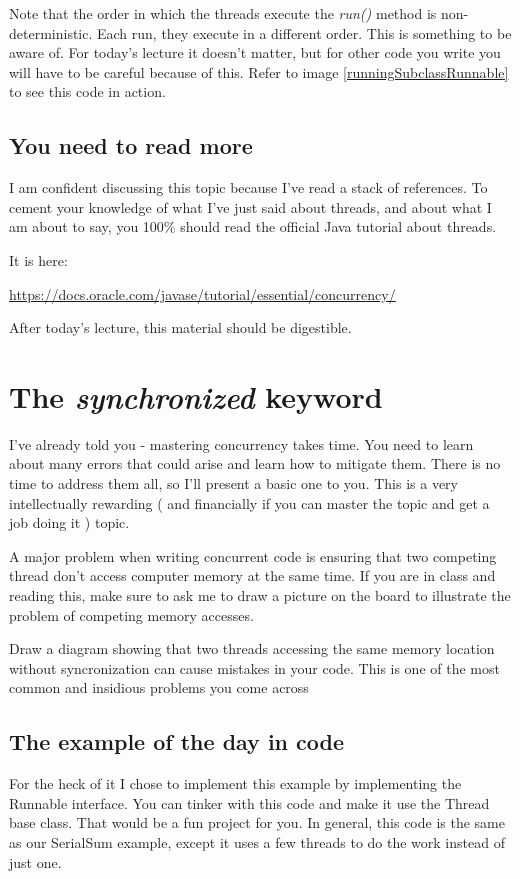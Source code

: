 \documentclass[12pt]{article}
\begin{document}
Note that the order in which the threads execute the \textit{run()} method is
non-deterministic. Each run, they execute in a different order. This is
something to be aware of. For today's lecture it doesn't matter, but for other
code you write you will have to be careful because of this. Refer to image
\ref{runningSubclassRunnable} to see this code in action.


\subsection{You need to read more}
I am confident discussing this topic because I've read a stack of references. To
cement your knowledge of what I've just said about threads, and about what I am
about to say, you 100\% should read the official Java tutorial about threads.

It is here:

\url{https://docs.oracle.com/javase/tutorial/essential/concurrency/}

After today's lecture, this material should be digestible.

\section{The \textit{synchronized} keyword}

I've already told you - mastering concurrency takes time. You need to learn
about many errors that could arise and learn how to mitigate them. There is no
time to address them all, so I'll present a basic one to you. This is a very
intellectually rewarding ( and financially if you can master the topic and get a
job doing it ) topic.


A major problem when writing concurrent code is ensuring that two competing
thread don't access computer memory at the same time. If you are in class and
reading this, make sure to ask me to draw a picture on the board to illustrate
the problem of competing memory accesses.

{\LARGE Draw a diagram showing that two threads accessing the same memory
location without syncronization can cause mistakes in your code. This is one of
the most common and insidious problems you come across}

\subsection{The example of the day in code}

For the heck of it I chose to implement this example by implementing the
Runnable interface. You can tinker with this code and make it use the Thread
base class. That would be a fun project for you. In general, this code is the
same as our SerialSum example, except it uses a few threads to do the work
instead of just one.
\end{document}

